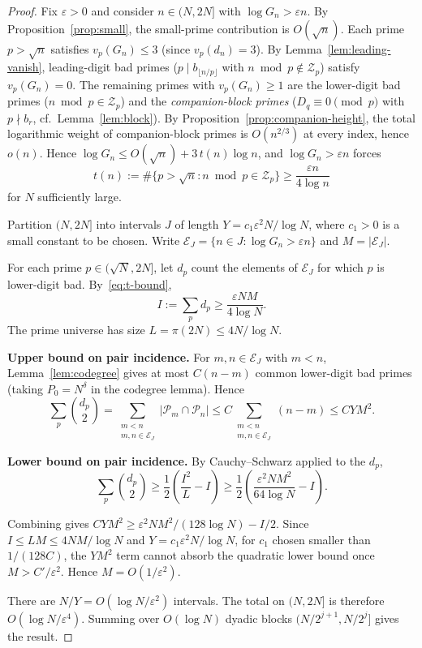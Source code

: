 \documentclass[11pt]{article}
\theoremstyle{definition}
\theoremstyle{remark}
\begin{document}
\begin{proof}
Fix $\varepsilon > 0$ and consider $n \in (N, 2N]$
with $\log G_n > \varepsilon n$.
By Proposition~\ref{prop:small}, the small-prime
contribution is $O(\sqrt{n})$.
Each prime $p > \sqrt{n}$ satisfies
$v_p(G_n) \le 3$ (since $v_p(d_n) = 3$).
By Lemma~\ref{lem:leading-vanish},
leading-digit bad primes ($p \mid b_{\lfloor n/p \rfloor}$
with $n \bmod p \notin \mathcal{Z}_p$)
satisfy $v_p(G_n) = 0$.
The remaining primes with $v_p(G_n) \ge 1$
are the lower-digit bad primes
($n \bmod p \in \mathcal{Z}_p$) and the
\emph{companion-block primes}
($D_q \equiv 0 \pmod{p}$ with
$p \nmid b_r$, cf.\ Lemma~\ref{lem:block}).
By Proposition~\ref{prop:companion-height},
the total logarithmic weight of companion-block
primes is $O(n^{2/3})$ at every index, hence
$o(n)$.
Hence $\log G_n \le O(\sqrt{n}) + 3\,t(n)\log n$,
and $\log G_n > \varepsilon n$ forces
\begin{equation}\label{eq:t-bound}
t(n) := \#\{p > \sqrt{n} : n\bmod p \in \mathcal{Z}_p\}
\ge \frac{\varepsilon n}{4\log n}
\end{equation}
for $N$ sufficiently large.

Partition $(N, 2N]$ into intervals $J$ of length
$Y = c_1 \varepsilon^2 N / \log N$, where $c_1 > 0$
is a small constant to be chosen.
Write $\mathcal{E}_J = \{n \in J : \log G_n > \varepsilon n\}$
and $M = |\mathcal{E}_J|$.

For each prime $p \in (\sqrt{N}, 2N]$, let $d_p$ count the
elements of $\mathcal{E}_J$ for which $p$ is
lower-digit bad. By~\eqref{eq:t-bound},
\[
I := \sum_p d_p \ge \frac{\varepsilon N M}{4 \log N}.
\]
The prime universe has size
$L = \pi(2N) \le 4N / \log N$.

\textbf{Upper bound on pair incidence.}
For $m, n \in \mathcal{E}_J$ with $m < n$,
Lemma~\ref{lem:codegree} gives at most $C(n - m)$
common lower-digit bad primes (taking
$P_0 = N^\delta$ in the codegree lemma).
Hence
\[
\sum_p \binom{d_p}{2}
= \sum_{\substack{m < n \\ m, n \in \mathcal{E}_J}}
|\mathcal{P}_m \cap \mathcal{P}_n|
\le C \sum_{\substack{m < n \\ m, n \in \mathcal{E}_J}}
(n - m)
\le C Y M^2.
\]

\textbf{Lower bound on pair incidence.}
By Cauchy--Schwarz applied to the $d_p$,
\[
\sum_p \binom{d_p}{2}
\ge \frac{1}{2}\!\left(\frac{I^2}{L} - I\right)
\ge \frac{1}{2}\!\left(
\frac{\varepsilon^2 N M^2}{64 \log N} - I
\right).
\]

Combining gives $CYM^2 \ge \varepsilon^2 N M^2 / (128 \log N) - I / 2$.
Since $I \le LM \le 4NM/\log N$ and $Y = c_1 \varepsilon^2 N / \log N$,
for $c_1$ chosen smaller than $1/(128 C)$,
the $YM^2$ term cannot absorb the quadratic lower bound
once $M > C' / \varepsilon^2$. Hence
$M = O(1/\varepsilon^2)$.

There are $N/Y = O(\log N / \varepsilon^2)$ intervals.
The total on $(N, 2N]$ is therefore
$O(\log N / \varepsilon^4)$.
Summing over $O(\log N)$ dyadic blocks
$(N/2^{j+1}, N/2^j]$ gives the result.
\end{proof}
\end{document}
